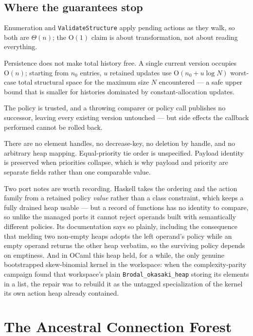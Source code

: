 \documentclass[11pt,twoside,openright]{book}
\newcommand{\code}[1]{\texorpdfstring{\textcolor{d7ink}{\texttt{#1}}}{#1}}
\newcommand{\bigoh}[1]{$\mathrm{O}(#1)$}
\begin{document}
\section{Where the guarantees stop}

\begin{caveatbox}
Enumeration and \code{ValidateStructure} apply pending actions as they walk, so
both are $\Theta(n)$; the \bigoh{1} claim is about transformation, not about
reading everything.

Persistence does not make total history free. A single current version occupies
\bigoh{n}; starting from $n_0$ entries, $u$ retained updates use
\bigoh{n_0 + u \log N} worst-case total structural space for the maximum size
$N$ encountered --- a safe upper bound that is smaller for histories dominated
by constant-allocation updates.

The policy is trusted, and a throwing comparer or policy call publishes no
successor, leaving every existing version untouched --- but side effects the
callback performed cannot be rolled back.

There are no element handles, no decrease-key, no deletion by handle, and no
arbitrary heap mapping. Equal-priority tie order is unspecified. Payload
identity is preserved when priorities collapse, which is why payload and
priority are separate fields rather than one comparable value.
\end{caveatbox}

Two port notes are worth recording. Haskell takes the ordering and the action
family from a retained policy \emph{value} rather than a class constraint, which
keeps a fully drained heap usable --- but a record of functions has no identity
to compare, so unlike the managed ports it cannot reject operands built with
semantically different policies. Its documentation says so plainly, including the
consequence that melding two non-empty heaps adopts the left operand's policy
while an empty operand returns the other heap verbatim, so the surviving policy
depends on emptiness. And in OCaml this heap held, for a while, the only genuine
bootstrapped skew-binomial kernel in the workspace: when the complexity-parity
campaign found that workspace's plain \code{Brodal\_okasaki\_heap} storing its
elements in a list, the repair was to rebuild it as the untagged specialization
of the kernel its own action heap already contained.

\chapter{The Ancestral Connection Forest}
\label{ch:connectivity}
\end{document}
